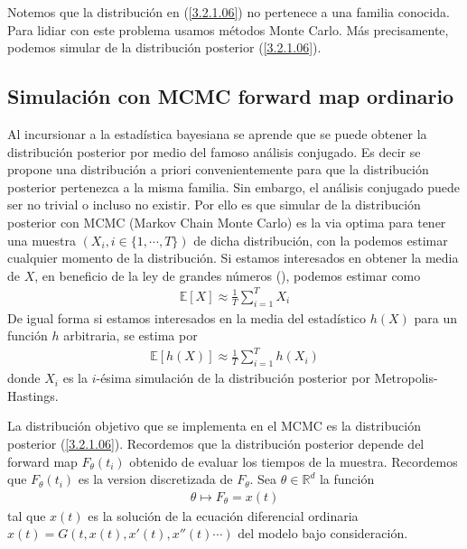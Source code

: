 Notemos que la distribución en (\ref{3.2.1.06}) no pertenece a una familia conocida. Para lidiar con este problema usamos métodos Monte Carlo. Más precisamente, podemos simular de la distribución posterior (\ref{3.2.1.06}).


\subsection{Simulación con MCMC forward map ordinario}

Al incursionar a la estadística bayesiana se aprende que se puede obtener la distribución posterior por medio del famoso análisis conjugado. Es decir se propone una distribución a priori convenientemente para que la distribución posterior pertenezca a la misma familia. Sin embargo, el análisis conjugado puede ser no trivial o incluso no existir. Por ello es que simular de la distribución posterior con MCMC (Markov Chain Monte Carlo) es la via optima para tener una muestra $(X_i, i \in \{1,\cdots, T\})$ de dicha distribución, con la podemos estimar cualquier momento de la distribución. Si estamos interesados en obtener la media de $X$, en beneficio de la ley de grandes números (\cite{van2000asymptotic}), podemos estimar como
\begin{align}
    \mathbb{E}\left [X\right ] \approx \frac{1}{T}\sum_{i = 1}^{T} X_i
\end{align}
De igual forma si estamos interesados en la media del estadístico $h(X)$ para un función $h$ arbitraria, se estima por
\begin{align}
    \mathbb{E}\left [h(X)\right ] \approx \frac{1}{T} \sum_{i=1}^{T} h(X_i)
    \label{3.2.2.01}
\end{align}
donde $X_i$ es la $i$-ésima simulación de la distribución posterior por Metropolis-Hastings.

La distribución objetivo que se implementa en el MCMC es la distribución posterior (\ref{3.2.1.06}). Recordemos que la distribución posterior depende del forward map $F_{\theta}(t_i)$ obtenido de evaluar los tiempos de la muestra. Recordemos que $F_{\theta}(t_i)$ es la version discretizada de $F_{\theta}$. Sea $\theta \in \mathbb{R}^d$ la función
\begin{align}
    \theta  \mapsto F_{\theta} = x(t) 
\end{align}
tal que $x(t)$ es la solución de la ecuación diferencial ordinaria $x(t) = G(t,x(t),x'(t),x''(t)\cdots)$ del modelo bajo consideración.

